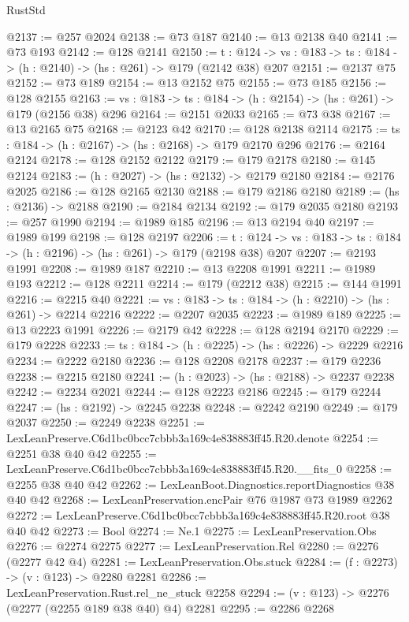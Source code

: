 \begin{lexlean}{RustStd}
\begin{coremodule}
@2137 := @257 @2024
@2138 := @73 @187
@2140 := @13 @2138 @40
@2141 := @73 @193
@2142 := @128 @2141
@2150 := {t : @124} ->
  {vs : @183} -> {ts : @184} -> (h : @2140) -> (hs : @261) -> @179 (@2142 @38) @207
@2151 := @2137 @75
@2152 := @73 @189
@2154 := @13 @2152 @75
@2155 := @73 @185
@2156 := @128 @2155
@2163 := {vs : @183} -> {ts : @184} -> (h : @2154) -> (hs : @261) -> @179 (@2156 @38) @296
@2164 := @2151 @2033
@2165 := @73 @38
@2167 := @13 @2165 @75
@2168 := @2123 @42
@2170 := @128 @2138 @2114
@2175 := {ts : @184} -> (h : @2167) -> (hs : @2168) -> @179 @2170 @296
@2176 := @2164 @2124
@2178 := @128 @2152 @2122
@2179 := @179 @2178
@2180 := @145 @2124
@2183 := (h : @2027) -> (hs : @2132) -> @2179 @2180
@2184 := @2176 @2025
@2186 := @128 @2165 @2130
@2188 := @179 @2186 @2180
@2189 := (hs : @2136) -> @2188
@2190 := @2184 @2134
@2192 := @179 @2035 @2180
@2193 := @257 @1990
@2194 := @1989 @185
@2196 := @13 @2194 @40
@2197 := @1989 @199
@2198 := @128 @2197
@2206 := {t : @124} ->
  {vs : @183} -> {ts : @184} -> (h : @2196) -> (hs : @261) -> @179 (@2198 @38) @207
@2207 := @2193 @1991
@2208 := @1989 @187
@2210 := @13 @2208 @1991
@2211 := @1989 @193
@2212 := @128 @2211
@2214 := @179 (@2212 @38)
@2215 := @144 @1991
@2216 := @2215 @40
@2221 := {vs : @183} -> {ts : @184} -> (h : @2210) -> (hs : @261) -> @2214 @2216
@2222 := @2207 @2035
@2223 := @1989 @189
@2225 := @13 @2223 @1991
@2226 := @2179 @42
@2228 := @128 @2194 @2170
@2229 := @179 @2228
@2233 := {ts : @184} -> (h : @2225) -> (hs : @2226) -> @2229 @2216
@2234 := @2222 @2180
@2236 := @128 @2208 @2178
@2237 := @179 @2236
@2238 := @2215 @2180
@2241 := (h : @2023) -> (hs : @2188) -> @2237 @2238
@2242 := @2234 @2021
@2244 := @128 @2223 @2186
@2245 := @179 @2244
@2247 := (hs : @2192) -> @2245 @2238
@2248 := @2242 @2190
@2249 := @179 @2037
@2250 := @2249 @2238
@2251 := LexLeanPreserve.C6d1bc0bcc7cbbb3a169c4e838883ff45.R20.denote
@2254 := @2251 @38 @40 @42
@2255 := LexLeanPreserve.C6d1bc0bcc7cbbb3a169c4e838883ff45.R20.__fits_0
@2258 := @2255 @38 @40 @42
@2262 := LexLeanBoot.Diagnostics.reportDiagnostics @38 @40 @42
@2268 := LexLeanPreservation.encPair @76 @1987 @73 @1989 @2262
@2272 := LexLeanPreserve.C6d1bc0bcc7cbbb3a169c4e838883ff45.R20.root @38 @40 @42
@2273 := Bool
@2274 := Ne.{1}
@2275 := LexLeanPreservation.Obs
@2276 := @2274 @2275
@2277 := LexLeanPreservation.Rel
@2280 := @2276 (@2277 @42 @4)
@2281 := LexLeanPreservation.Obs.stuck
@2284 := (f : @2273) -> (v : @123) -> @2280 @2281
@2286 := LexLeanPreservation.Rust.rel_ne_stuck @2258
@2294 := (v : @123) -> @2276 (@2277 (@2255 @189 @38 @40) @4) @2281
@2295 := @2286 @2268

\end{coremodule}
\end{lexlean}
